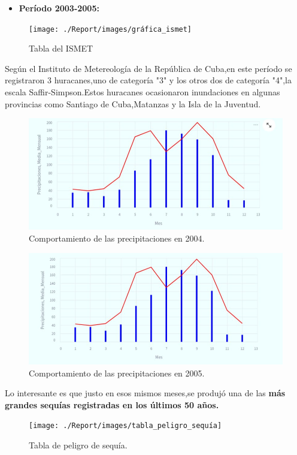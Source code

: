\documentclass[12pt]{article}
\begin{document}
\begin{itemize}
	\item\textbf{Período 2003-2005:}
\end{itemize}

\begin{figure}[H]
	\centering
	\texttt{[image: ./Report/images/gráfica\_ismet]}
	\caption{Tabla del ISMET}
	\label{fig:graficaismet}
\end{figure}


Según el Instituto de Metereología de la República de Cuba,en este período se registraron 3 huracanes,uno de categoría "3" y los otros dos de categoría "4",la escala Saffir-Simpson.Estos huracanes ocasionaron inundaciones en algunas provincias como Santiago de Cuba,Matanzas y la Isla de la Juventud.\cite{webpage4}


\begin{figure}[H]
	\centering
	\includegraphics[width=0.7\linewidth]{./Report/images/precipitaciones_2004}
	\caption{Comportamiento de las precipitaciones en 2004.}
	\label{fig:precipitaciones2004}
\end{figure}


\begin{figure}[H]
	\centering
	\includegraphics[width=0.7\linewidth]{./Report/images/precipitaciones_2005}
	\caption{Comportamiento de las precipitaciones en 2005.}
	\label{fig:precipitaciones2005}
\end{figure}


Lo interesante es que justo en esos mismos meses,se produjó una de las\textbf{ más grandes sequías registradas en los últimos 50 años.}\cite{webpage5}


\begin{figure}[H]
	\centering
	\texttt{[image: ./Report/images/tabla\_peligro\_sequía]}
	\caption{Tabla de peligro de sequía.}
	\label{fig:tablapeligrosequia}
\end{figure}
\end{document}
